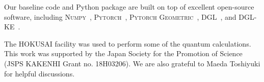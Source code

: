 \documentclass{article}
\begin{document}
Our baseline code and Python package are built on top of excellent open-source software, including \textsc{Numpy}~\citep{harris2020array}, \textsc{Pytorch}~\citep{paszke2017automatic}, \textsc{Pytorch Geometric}~\citep{fey2019fast}, \textsc{DGL}~\citep{wang2019dgl}, and \textsc{DGL-KE}~\citep{zheng2020dgl}.

The HOKUSAI facility was used to perform some of the quantum calculations. This work was supported by the Japan Society for the Promotion of Science (JSPS KAKENHI Grant no. 18H03206). We are also grateful to Maeda Toshiyuki for helpful discussions.





\end{document}
